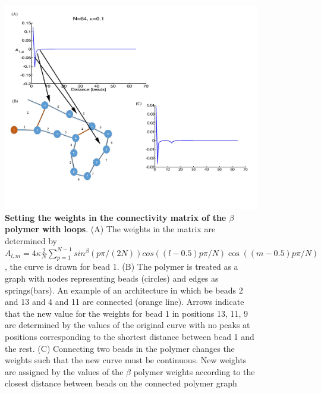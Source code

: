 \documentclass[12pt]{article}
\begin{document}
\begin{figure}[H]
\includegraphics[scale=0.6]{Figure05_betaModelWeights}
\caption{\textbf{Setting the weights in the connectivity matrix of the $\beta$ polymer with loops}. (A) The weights in the matrix are determined by $A_{l,m}= 4\kappa \frac{2}{N}\sum_{p=1}^{N-1} sin^{\beta}(p\pi/(2N))cos((l-0.5)p\pi/N)\cos((m-0.5)p\pi/N)$, the curve is drawn for bead 1. (B) The polymer is treated as a graph with nodes representing beads (circles) and edges as springs(bars). An example of an architecture in which be beads 2 and 13 and 4 and 11 are connected (orange line). Arrows indicate that the new value for the weights for bead 1 in positions 13, 11, 9 are determined by the values of the original curve with no peaks at positions corresponding to the shortest distance between bead 1 and the rest. (C) Connecting two beads in the polymer changes the weights such that the new curve must be continuous.  New weights are assigned by the values of the $\beta$ polymer weights according to the closest distance between beads on the connected polymer graph}
\label{settingBetsModelWeights}
\end{figure}
\end{document}
